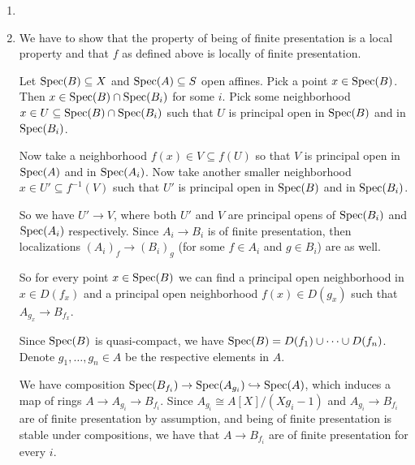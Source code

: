 \begin{exercise}{4}
    \begin{enumerate}
        \item{}
        \item{
                We have to show that the property of being of finite
                presentation is a local property and that $f$ as defined above
                is locally of finite presentation.

                Let $\operatorname{Spec}(B) \subseteq X$ and $\operatorname{Spec}(A) \subseteq S$ open
                affines.
                Pick a point $x \in \operatorname{Spec}(B)$. Then $x \in \operatorname{Spec}(B) \cap
                \operatorname{Spec}(B_i)$ for some $i$. Pick some neighborhood $x \in U \subseteq \operatorname{Spec}(B) \cap
                \operatorname{Spec}(B_i)$ such that $U$ is principal open in $\operatorname{Spec}(B)$
                and in $\operatorname{Spec}(B_i)$.

                Now take a neighborhood $f(x) \in V \subseteq f(U)$ so that $V$
                is principal open in $\operatorname{Spec}(A)$ and in $\operatorname{Spec}(A_i)$.
                Now take another smaller neighborhood $x \in U' \subseteq
                f^{-1}(V)$ such that $U'$ is principal open in $\operatorname{Spec}(B)$ and in
                $\operatorname{Spec}(B_i)$.

                So we have $U' \to V$, where both $U'$ and $V$ are principal
                opens of $\operatorname{Spec}(B_i)$ and $\operatorname{Spec}(A_i)$ respectively. Since $A_i
                \to B_i$ is of finite presentation, then localizations $(A_i)_f
                \to (B_i)_g$ (for some $f \in A_i$ and $g \in B_i$) are as well.

                So for every point $x \in \operatorname{Spec}(B)$ we can find a principal open
                neighborhood in $x \in D(f_x)$ and a principal open
                neighborhood $f(x) \in D(g_x)$ such that $A_{g_x} \to B_{f_x}$.

                Since $\operatorname{Spec}(B)$ is quasi-compact, we have $\operatorname{Spec}(B) = D(f_1)
                \cup \dots \cup D(f_n)$. Denote $g_1, \dots, g_n \in A$ be the
                respective elements in $A$.

                We have composition $\operatorname{Spec}(B_{f_i}) \to \operatorname{Spec}(A_{g_i}) \hookrightarrow
                \operatorname{Spec}(A)$, which induces a map of rings $A \to A_{g_i} \to B_{f_i}$.
                Since $A_{g_i} \cong A[X]/(X g_i - 1)$ and $A_{g_i} \to B_{f_i}$
                are of finite presentation by assumption, and being of
                finite presentation is stable under compositions, we have that
                $A \to B_{f_i}$ are of finite presentation for every $i$.

}
\end{enumerate}
\end{exercise}
